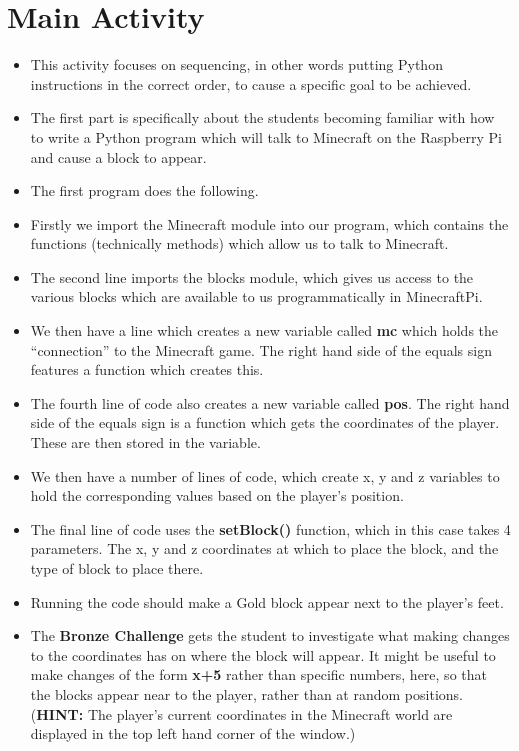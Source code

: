 \documentclass{geocraft-lesson-plan}
\begin{document}
\section*{Main Activity}
\begin{itemize}
\item This activity focuses on sequencing, in other words putting Python instructions in the correct order, to cause a
  specific goal to be achieved.
\item The first part is specifically about the students becoming familiar with how to write a Python program which will
  talk to Minecraft on the Raspberry Pi and cause a block to appear.
\item The first program does the following.
\item Firstly we import the Minecraft module into our program, which contains the functions (technically methods) which
  allow us to talk to Minecraft.
\item The second line imports the blocks module, which gives us access to the various blocks which are available to us
 programmatically in MinecraftPi. 
\item We then have a line which creates a new variable called \textbf{mc} which holds the ``connection'' to the
  Minecraft game. The right hand side of the equals sign features a function which creates this.
\item The fourth line of code also creates a new variable called \textbf{pos}. The right hand side of the equals sign is
  a function which gets the coordinates of the player. These are then stored in the variable.
\item We then have a number of lines of code, which create x, y and z variables to hold the corresponding values based
  on the player's position.
\item The final line of code uses the \textbf{setBlock()} function, which in this case takes 4 parameters. The x, y and
  z coordinates at which to place the block, and the type of block to place there.
\item Running the code should make a Gold block appear next to the player's feet.
\item The \textbf{Bronze Challenge} gets the student to investigate what making changes to the coordinates has on where
  the block will appear. It might be useful to make changes of the form \textbf{x+5} rather than specific numbers, here,
  so that the blocks appear near to the player, rather than at random positions. (\textbf{HINT:} The player's current
  coordinates in the Minecraft world are displayed in the top left hand corner of the window.)

\end{itemize}
\end{document}
